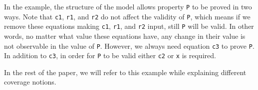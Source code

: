 In the example, the structure of the model allows property {\tt P} to be proved in two ways.
Note that {\tt c1}, {\tt r1}, and {\tt r2} do not affect the validity of {\tt P}, which means
if we remove these equations making {\tt c1}, {\tt r1}, and {\tt r2} input, still {\tt P} will be valid.
In other words, no matter what value these equations have, any change in their value is not observable in the value of {\tt P}.
However, we always need equation {\tt c3} to prove {\tt P}. In addition to {\tt c3}, in order for {\tt P} to be valid either {\tt c2} or {\tt x} is required.

In the rest of the paper, we will refer to this example while explaining different coverage notions.
\fi


